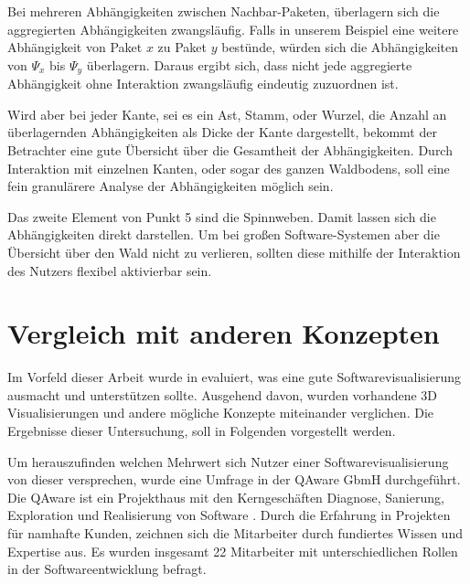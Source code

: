 Bei mehreren Abhängigkeiten zwischen Nachbar-Paketen, überlagern sich die aggregierten Abhängigkeiten zwangsläufig. Falls in unserem Beispiel eine weitere Abhängigkeit von Paket $x$ zu Paket $y$ bestünde, würden sich die Abhängigkeiten von $\Psi_x$ bis $\Psi_y$ überlagern. Daraus ergibt sich, dass nicht jede aggregierte Abhängigkeit ohne Interaktion zwangsläufig eindeutig zuzuordnen ist.

Wird aber bei jeder Kante, sei es ein Ast, Stamm, oder Wurzel, die Anzahl an überlagernden Abhängigkeiten als Dicke der Kante dargestellt, bekommt der Betrachter eine gute Übersicht über die Gesamtheit der Abhängigkeiten. Durch Interaktion mit einzelnen Kanten, oder sogar des ganzen Waldbodens, soll eine fein granulärere Analyse der Abhängigkeiten möglich sein.

Das zweite Element von Punkt 5 sind die Spinnweben. Damit lassen sich die Abhängigkeiten direkt darstellen. Um bei großen Software-Systemen aber die Übersicht über den Wald nicht zu verlieren, sollten diese mithilfe der Interaktion des Nutzers flexibel aktivierbar sein.

\section{Vergleich mit anderen Konzepten}
\label{sec:comparison}

Im Vorfeld dieser Arbeit wurde in \cite{puetz2017softwarevisualisierung} evaluiert, was eine gute Softwarevisualisierung ausmacht und unterstützen sollte. Ausgehend davon, wurden vorhandene 3D Visualisierungen und andere mögliche Konzepte miteinander verglichen. Die Ergebnisse dieser Untersuchung, soll in Folgenden vorgestellt werden.

Um herauszufinden welchen Mehrwert sich Nutzer einer Softwarevisualisierung von dieser versprechen, wurde eine Umfrage in der QAware GbmH durchgeführt. Die QAware ist ein Projekthaus mit den Kerngeschäften Diagnose, Sanierung, Exploration und Realisierung von Software \cite{qaware2017it-probleme}. Durch die Erfahrung in Projekten für namhafte Kunden, zeichnen sich die Mitarbeiter durch fundiertes Wissen und Expertise aus. Es wurden insgesamt 22 Mitarbeiter mit unterschiedlichen Rollen in der Softwareentwicklung befragt.

